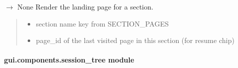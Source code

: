 \documentclass[letterpaper,10pt,english]{sphinxmanual}
\begin{document}
\begin{fulllineitems}
\label{\detokenize{gui.components.section_landing:gui.components.section_landing.render}}
\pysigstartsignatures
\pysiglinewithargsret
{}
{\sphinxparamcomma {}}
{{ $\rightarrow$ None}}
\pysigstopsignatures
\sphinxAtStartPar
Render the landing page for a section.
\begin{quote}\begin{description}
\begin{itemize}
\item {} 
\sphinxAtStartPar
{} \textendash{} section name key from SECTION\_PAGES

\item {} 
\sphinxAtStartPar
{} \textendash{} page\_id of the last visited page in this section (for resume chip)

\end{itemize}

\end{description}\end{quote}

\end{fulllineitems}


\sphinxstepscope


\paragraph{gui.components.session\_tree module}
\label{\detokenize{gui.components.session_tree:module-gui.components.session_tree}}\label{\detokenize{gui.components.session_tree:gui-components-session-tree-module}}\label{\detokenize{gui.components.session_tree::doc}}
\end{document}
